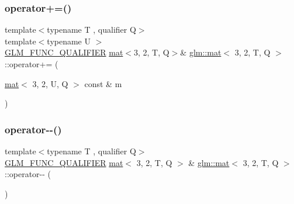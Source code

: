 \subsubsection{\texorpdfstring{operator+=()}{operator+=()}\hspace{0.1cm}{\footnotesize\ttfamily [4/4]}}
{\footnotesize\ttfamily template$<$typename T , qualifier Q$>$ \\
template$<$typename U $>$ \\
\hyperlink{setup_8hpp_a33fdea6f91c5f834105f7415e2a64407}{G\+L\+M\+\_\+\+F\+U\+N\+C\+\_\+\+Q\+U\+A\+L\+I\+F\+I\+ER} \hyperlink{structglm_1_1mat}{mat}$<$3, 2, T, Q$>$\& \hyperlink{structglm_1_1mat}{glm\+::mat}$<$ 3, 2, T, Q $>$\+::operator+= (\begin{DoxyParamCaption}\item[{\hyperlink{structglm_1_1mat}{mat}$<$ 3, 2, U, Q $>$ const \&}]{m }\end{DoxyParamCaption})}

\mbox{\label{structglm_1_1mat_3_013_00_012_00_01_t_00_01_q_01_4_a0968f00c3de947faa30c496ff103a0ec}} 
\subsubsection{\texorpdfstring{operator-\/-\/()}{operator--()}\hspace{0.1cm}{\footnotesize\ttfamily [1/2]}}
{\footnotesize\ttfamily template$<$typename T , qualifier Q$>$ \\
\hyperlink{setup_8hpp_a33fdea6f91c5f834105f7415e2a64407}{G\+L\+M\+\_\+\+F\+U\+N\+C\+\_\+\+Q\+U\+A\+L\+I\+F\+I\+ER} \hyperlink{structglm_1_1mat}{mat}$<$ 3, 2, T, Q $>$ \& \hyperlink{structglm_1_1mat}{glm\+::mat}$<$ 3, 2, T, Q $>$\+::operator-\/-\/ (\begin{DoxyParamCaption}{ }\end{DoxyParamCaption})}

\mbox{\label{structglm_1_1mat_3_013_00_012_00_01_t_00_01_q_01_4_a1d64f18f5052894c3ce72e27ddd23a19}} 
